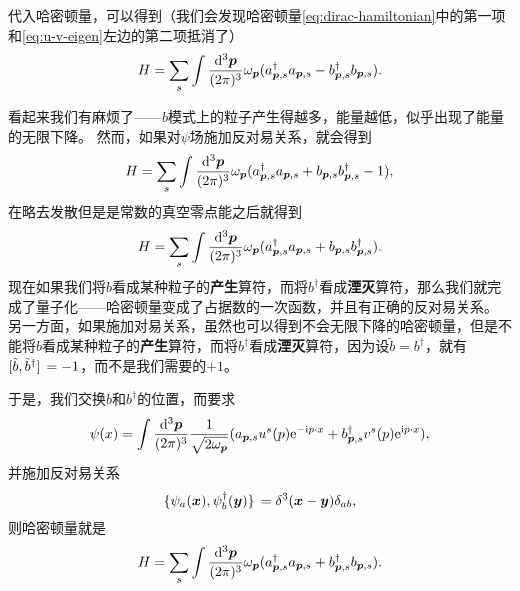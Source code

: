 \documentclass[hyperref, UTF8, a4paper]{ctexart}
\newcommand*{\ii}{\mathrm{i}}
\newcommand*{\ee}{\mathrm{e}}
\renewcommand{\emph}{\textbf}
\begin{document}
代入哈密顿量，可以得到（我们会发现哈密顿量\eqref{eq:dirac-hamiltonian}中的第一项和\eqref{eq:u-v-eigen}左边的第二项抵消了）
\[
    H = \sum_{s} \int \frac{\dd[3]{\vb*{p}}}{(2\pi)^3} \omega_{\vb*{p}} (a^\dagger_{\vb*{p}, s} a_{\vb*{p}, s} - b^\dagger_{\vb*{p}, s} b_{\vb*{p}, s}).
\]

看起来我们有麻烦了——$b$模式上的粒子产生得越多，能量越低，似乎出现了能量的无限下降。
然而，如果对$\psi$场施加反对易关系，就会得到
\[
    H = \sum_{s} \int \frac{\dd[3]{\vb*{p}}}{(2\pi)^3} \omega_{\vb*{p}} (a^\dagger_{\vb*{p}, s} a_{\vb*{p}, s} + b_{\vb*{p}, s} b^\dagger_{\vb*{p}, s} - 1),
\]
在略去发散但是是常数的真空零点能之后就得到
\begin{equation}
    H = \sum_{s} \int \frac{\dd[3]{\vb*{p}}}{(2\pi)^3} \omega_{\vb*{p}} (a^\dagger_{\vb*{p}, s} a_{\vb*{p}, s} + b_{\vb*{p}, s} b^\dagger_{\vb*{p}, s} ).
\end{equation}
现在如果我们将$b$看成某种粒子的\emph{产生}算符，而将$b^\dagger$看成\emph{湮灭}算符，那么我们就完成了量子化——哈密顿量变成了占据数的一次函数，并且有正确的反对易关系。
另一方面，如果施加对易关系，虽然也可以得到不会无限下降的哈密顿量，但是不能将$b$看成某种粒子的\emph{产生}算符，而将$b^\dagger$看成\emph{湮灭}算符，因为设$\tilde{b} = b^\dagger$，就有$\comm*{\tilde{b}}{\tilde{b}^\dagger} = -1$，而不是我们需要的$+1$。

于是，我们交换$b$和$b^\dagger$的位置，而要求
\begin{equation}
    \psi(x) = \int \frac{\dd[3]{\vb*{p}}}{(2\pi)^3} \frac{1}{\sqrt{2 \omega_{\vb*{p}}}} (a_{\vb*{p}, s} u^s(p) \ee^{-\ii p \cdot x} + b^\dagger_{\vb*{p}, s} v^s(p) \ee^{\ii p \cdot x}),
\end{equation}
并施加反对易关系
\begin{equation}
    \acomm*{\psi_a(\vb*{x})}{\psi^\dagger_b(\vb*{y})} = \delta^3(\vb*{x} - \vb*{y}) \delta_{ab},
\end{equation}
则哈密顿量就是
\begin{equation}
    H = \sum_{s} \int \frac{\dd[3]{\vb*{p}}}{(2\pi)^3} \omega_{\vb*{p}} (a^\dagger_{\vb*{p}, s} a_{\vb*{p}, s} + b^\dagger_{\vb*{p}, s} b_{\vb*{p}, s} ).
\end{equation}
\end{document}
